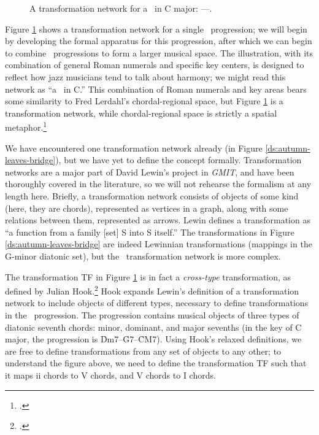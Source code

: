 \begin{figure}[tbp]
  \caption[A transformation network for a single \tfo\ progression.]{A
  transformation network for a \tfo\ in C major: ----.}
  \label{tf:single-tfo-network}
\end{figure}

Figure \ref{tf:single-tfo-network} shows a transformation network for a single
\tfo\ progression; we will begin by developing the formal apparatus for this
progression, after which we can begin to combine \tfo\ progressions to form a
larger musical space. The illustration, with its combination of
general Roman numerals and specific key centers, is designed to reflect how
jazz musicians tend to talk about harmony; we might read this network as “a
\tfo\ in C.” This combination of Roman numerals and key areas bears some
similarity to Fred Lerdahl’s chordal-regional space, but Figure
\ref{tf:single-tfo-network} is a transformation network, while
chordal-regional space is strictly a spatial
metaphor.\footcite[96--97]{lerdahl:2004}

We have encountered one transformation network already (in Figure
\ref{ds:autumn-leaves-bridge}), but we have yet to define the concept
formally.  Transformation networks are a major part of David Lewin’s project
in \emph{GMIT}, and have been thoroughly covered in the literature, so we will
not rehearse the formalism at any length here. Briefly, a
transformation network consists of objects of some kind (here, they are
chords), represented as vertices in a graph, along with some relations between
them, represented as arrows. Lewin defines a transformation as “a function
from a family [set] S into S itself.” The transformations in Figure
\ref{ds:autumn-leaves-bridge} are indeed Lewinnian transformations (mappings
in the G-minor diatonic set), but the \tfo\ transformation network is more
complex.

The transformation TF in Figure \ref{tf:single-tfo-network} is in fact a
\emph{cross-type} transformation, as defined by Julian
Hook.\footcite{hook:2007} Hook expands Lewin’s definition of a transformation
network to include objects of different types, necessary to define
transformations in the \tfo\ progression. The progression contains musical
objects of three types of diatonic seventh chords: minor, dominant,
and major sevenths (in the key of C major, the progression is
\h{Dm7}--\h{G7}--\h{CM7}). Using Hook’s relaxed definitions, we are free to
define transformations from any set of objects to any other; to understand the
figure above, we need to define the transformation TF such that it maps
ii chords to V chords, and V chords to I
chords.

